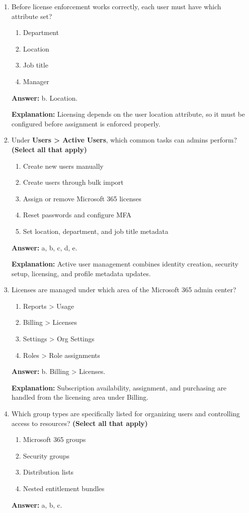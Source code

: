\documentclass[10pt]{article}
\begin{document}
\begin{enumerate}[leftmargin=*]
\item Before license enforcement works correctly, each user must have which attribute set?
\begin{enumerate}[label=\alph*., leftmargin=1.5em]
\item Department
\item Location
\item Job title
\item Manager
\end{enumerate}
\textbf{Answer:} b. Location.

\textbf{Explanation:} Licensing depends on the user location attribute, so it must be configured before assignment is enforced properly.

\item Under \textbf{Users > Active Users}, which common tasks can admins perform? \textbf{(Select all that apply)}
\begin{enumerate}[label=\alph*., leftmargin=1.5em]
\item Create new users manually
\item Create users through bulk import
\item Assign or remove Microsoft 365 licenses
\item Reset passwords and configure MFA
\item Set location, department, and job title metadata
\end{enumerate}
\textbf{Answer:} a, b, c, d, e.

\textbf{Explanation:} Active user management combines identity creation, security setup, licensing, and profile metadata updates.

\item Licenses are managed under which area of the Microsoft 365 admin center?
\begin{enumerate}[label=\alph*., leftmargin=1.5em]
\item Reports > Usage
\item Billing > Licenses
\item Settings > Org Settings
\item Roles > Role assignments
\end{enumerate}
\textbf{Answer:} b. Billing > Licenses.

\textbf{Explanation:} Subscription availability, assignment, and purchasing are handled from the licensing area under Billing.

\item Which group types are specifically listed for organizing users and controlling access to resources? \textbf{(Select all that apply)}
\begin{enumerate}[label=\alph*., leftmargin=1.5em]
\item Microsoft 365 groups
\item Security groups
\item Distribution lists
\item Nested entitlement bundles
\end{enumerate}
\textbf{Answer:} a, b, c.


\end{enumerate}
\end{document}
